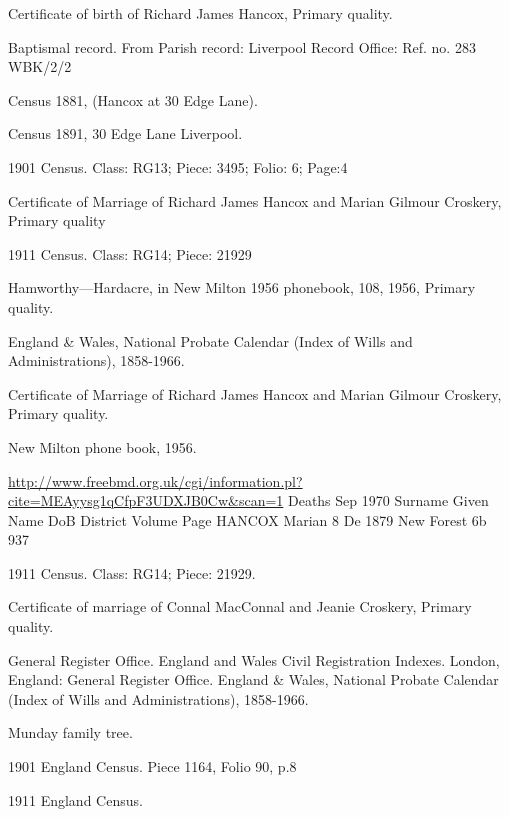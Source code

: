 \begin{thebibliography}{99}
	Certificate of birth of Richard James Hancox, Primary quality.
	
	 Baptismal record. From Parish record: Liverpool Record Office: Ref. no. 283 WBK/2/2
	 
	Census 1881, (Hancox at 30 Edge Lane).
	
	Census 1891, 30 Edge Lane Liverpool.

	1901 Census. Class: RG13; Piece: 3495; Folio: 6; Page:4

	 Certificate of Marriage of Richard James Hancox and Marian Gilmour Croskery, Primary quality
	 
	1911 Census. Class: RG14; Piece: 21929
	
	Hamworthy—Hardacre, in New Milton 1956 phonebook, 108, 1956, Primary quality.
	
	England \& Wales, National Probate Calendar (Index of Wills and Administrations), 1858-1966.
	 
	Certificate of Marriage of Richard James Hancox and Marian Gilmour Croskery, Primary quality.
	
	New Milton phone book, 1956. 
	
	\url{http://www.freebmd.org.uk/cgi/information.pl?cite=MEAyysg1qCfpF3UDXJB0Cw&scan=1}
	Deaths Sep 1970
	Surname     Given Name      DoB         District    Volume      Page    
	HANCOX      Marian          8 De 1879   New Forest  6b          937
	
	1911 Census. Class: RG14; Piece: 21929.
	
	Certificate of marriage of Connal MacConnal and Jeanie Croskery, Primary quality.
	
	General Register Office. England and Wales Civil Registration Indexes. London, England: General Register Office.
	England \& Wales, National Probate Calendar (Index of Wills and Administrations), 1858-1966. 
	
	Munday family tree. 
	
	 1901 England Census. Piece 1164, Folio 90, p.8

	1911 England Census.
	

\end{thebibliography}
